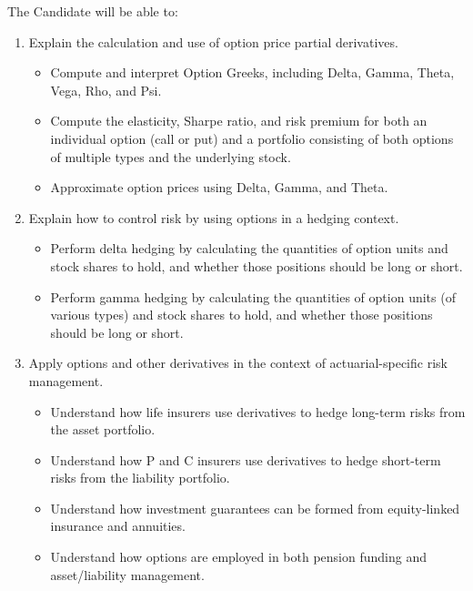 \begin{outcomes}
The Candidate will be able to:
\begin{enumerate}[label = \alph*)]
	\item	Explain the calculation and use of option price partial derivatives.
		\begin{knowledge}[]
		\begin{itemize}
		\item	Compute and interpret Option Greeks, including Delta, Gamma, Theta, Vega, Rho, and Psi.
		\item	Compute the elasticity, Sharpe ratio, and risk premium for both an individual option (call or put) and a portfolio consisting of both options of multiple types and the underlying stock.
		\item	Approximate option prices using Delta, Gamma, and Theta.
		\end{itemize}
		\end{knowledge}
	\item	Explain how to control risk by using options in a hedging context.
		\begin{knowledge}[]
		\begin{itemize}
		\item	Perform delta hedging by calculating the quantities of option units and stock shares to hold, and whether those positions should be long or short. 
		\item	Perform gamma hedging by calculating the quantities of option units (of various types) and stock shares to hold, and whether those positions should be long or short.
		\end{itemize}
		\end{knowledge}
	\item	Apply options and other derivatives in the context of actuarial-specific risk management.
		\begin{knowledge}[]
		\begin{itemize}
		\item	Understand how life insurers use derivatives to hedge long-term risks from the asset portfolio.
		\item	Understand how P and C insurers use derivatives to hedge short-term risks from the liability portfolio.
		\item	Understand how investment guarantees can be formed from equity-linked insurance and annuities.
		\item	Understand how options are employed in both pension funding and asset/liability management.
		\end{itemize}
		\end{knowledge}
	\end{enumerate}
\end{outcomes}

